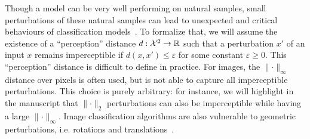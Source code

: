 Though a model can be very well performing on natural samples, small perturbations of these natural samples can lead to unexpected and critical behaviours of classification models~\citep{biggio2013evasion,Szegedy2013IntriguingPO}. To formalize that, we will assume the existence of a ``perception'' distance $d:\mathcal{X}^2\to\mathbb{R}$ such that a perturbation $x'$ of an input $x$ remains imperceptible if $d(x,x')\leq \varepsilon$ for some constant $\varepsilon\geq0$. This ``perception'' distance is difficult to define in practice. For images, the $\lVert\cdot\rVert_\infty$ distance over pixels is often used, but is not able to capture all imperceptible perturbations.  This choice is purely arbitrary: for instance, we will highlight in the manuscript that $\lVert\cdot\rVert_2$ perturbations can also be imperceptible while having a large $\lVert\cdot\rVert_\infty$. Image classification algorithms are also vulnerable to geometric perturbations, i.e. rotations and translations~\citep{kanbak2018geometric,engstrom2019exploring}.

